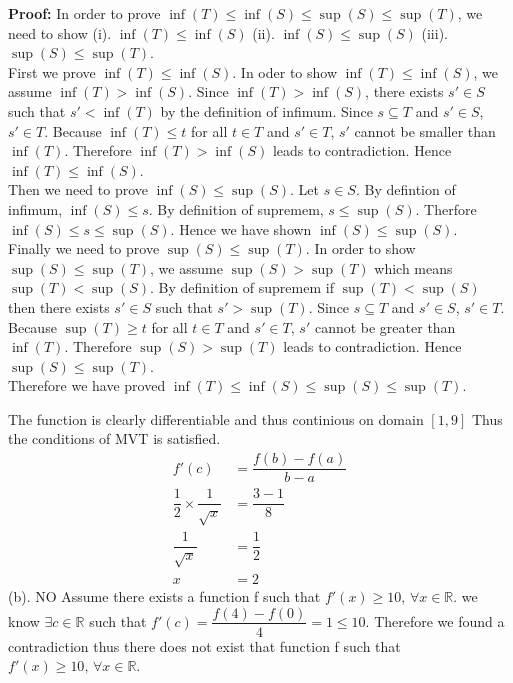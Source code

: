 \documentclass{article}
\begin{document}
\begin{enumerate}
{\bf Proof:} In order to prove $\inf(T) \le \inf(S)  \le \sup(S) \le \sup(T)$, we need to show (i). $\inf(T) \le \inf(S)$ (ii). $\inf(S)  \le \sup(S)$ (iii).$\sup(S) \le \sup(T)$.\\

First we prove $\inf(T) \le \inf(S)$. In oder to show $\inf(T) \le \inf(S)$, we assume $\inf(T) > \inf(S)$. Since $\inf(T) > \inf(S)$, there exists $s' \in S$ such that $s'<\inf(T)$ by the definition of infimum. Since $s \subseteq T$ and $s' \in S$, $s' \in T$. Because $\inf(T) \leq t$ for all $t \in T$ and $s' \in T$, $s'$ cannot be smaller than $\inf(T)$. Therefore $\inf(T) > \inf(S)$ leads to contradiction. Hence $\inf(T) \le \inf(S)$.\\

Then we need to prove $\inf(S)  \le \sup(S)$. Let $s \in S$. By defintion of infimum, $\inf(S) \le s$. By definition of supremem, $s \le \sup(S)$. Therfore $\inf(S) \le s \le \sup(S)$. Hence we have shown $\inf(S) \le \sup(S)$.\\

Finally we need to prove $\sup(S) \le \sup(T)$. In order to show $\sup(S) \le \sup(T)$, we assume $\sup(S) > \sup(T)$ which means $\sup(T) < \sup(S)$. By definition of supremem if $\sup(T) < \sup(S)$ then there exists $s' \in S$ such that $s' > \sup(T)$. Since $s \subseteq T$ and $s' \in S$, $s' \in T$. Because $\sup(T) \geq t$ for all $t \in T$ and $s' \in T$, $s'$ cannot be greater than $\inf(T)$. Therefore $\sup(S) > \sup(T)$ leads to contradiction. Hence $\sup(S) \le \sup(T)$.\\

Therefore we have proved $\inf(T) \le \inf(S)  \le \sup(S) \le \sup(T)$.

\newpage

The function is clearly differentiable and thus continious on domain $[1,9]$ Thus the conditions of MVT is satisfied.
\begin{align*}
	f'(c) & = \dfrac{f(b)-f(a)}{b-a}\\
	\dfrac{1}{2} \times \dfrac{1}{\sqrt{x}} & = \dfrac{3-1}{8}\\
	\dfrac{1}{\sqrt{x}} & = \dfrac{1}{2}\\
	x & = 2
\end{align*}
(b). NO
Assume there exists a function f such that $f'(x)\geq10 \text{, }\forall x \in \mathbb{R}$. we know $\exists c \in \mathbb{R}$ such that $f'(c) = \dfrac{f(4)-f(0)}{4} = 1 \leq 10$. Therefore we found a contradiction thus there does not exist that function f such that $f'(x)\geq10 \text{, } \forall x \in \mathbb{R}$.
\end{enumerate}
\end{document}
